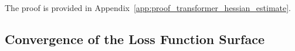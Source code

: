 \documentclass{article}
\newtheorem{theorem}{Theorem} %
\begin{document}


The proof is provided in Appendix~\ref{app:proof_transformer_hessian_estimate}.



\subsection{Convergence of the Loss Function Surface}\label{subsec:loss_convergence}
\end{document}
